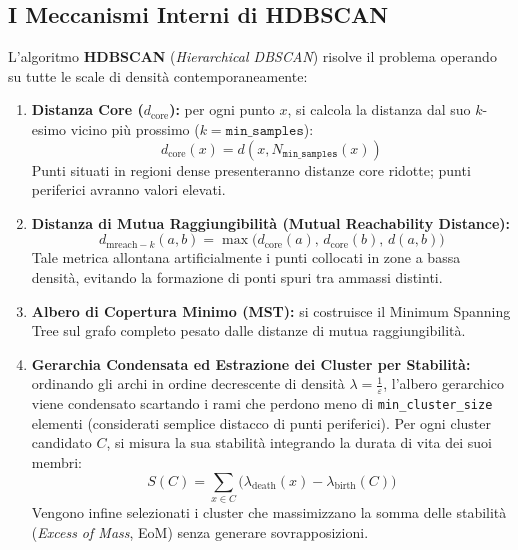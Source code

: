 \FloatBarrier
\subsection{I Meccanismi Interni di HDBSCAN}
\label{subsec:lab-hdbscan-internals}

L'algoritmo \textbf{HDBSCAN} (\textit{Hierarchical DBSCAN}) \cite{campello2015} risolve il problema operando su tutte le scale di densità contemporaneamente:
\begin{enumerate}
    \item \textbf{Distanza Core ($d_{\text{core}}$):} per ogni punto $x$, si calcola la distanza dal suo $k$-esimo vicino più prossimo ($k = \texttt{min\_samples}$):
    \begin{equation}
        d_{\text{core}}(x) = d(x, N_{\texttt{min\_samples}}(x))
    \end{equation}
    Punti situati in regioni dense presenteranno distanze core ridotte; punti periferici avranno valori elevati.
    \item \textbf{Distanza di Mutua Raggiungibilità (Mutual Reachability Distance):}
    \begin{equation}
        d_{\text{mreach}-k}(a, b) = \max\big( d_{\text{core}}(a),\, d_{\text{core}}(b),\, d(a, b) \big)
    \end{equation}
    Tale metrica allontana artificialmente i punti collocati in zone a bassa densità, evitando la formazione di ponti spuri tra ammassi distinti.
    \item \textbf{Albero di Copertura Minimo (MST):} si costruisce il Minimum Spanning Tree sul grafo completo pesato dalle distanze di mutua raggiungibilità.
    \item \textbf{Gerarchia Condensata ed Estrazione dei Cluster per Stabilità:} ordinando gli archi in ordine decrescente di densità $\lambda = \frac{1}{\varepsilon}$, l'albero gerarchico viene condensato scartando i rami che perdono meno di \texttt{min\_cluster\_size} elementi (considerati semplice distacco di punti periferici). Per ogni cluster candidato $C$, si misura la sua stabilità integrando la durata di vita dei suoi membri:
    \begin{equation}
        S(C) = \sum_{x \in C} \big( \lambda_{\text{death}}(x) - \lambda_{\text{birth}}(C) \big)
    \end{equation}
    Vengono infine selezionati i cluster che massimizzano la somma delle stabilità (\textit{Excess of Mass}, EoM) senza generare sovrapposizioni.
\end{enumerate}

